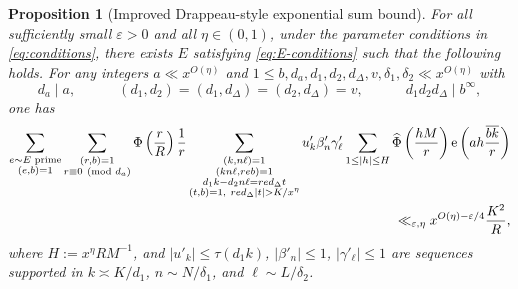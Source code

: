 \documentclass[reqno,11pt]{amsart}
\newtheorem{proposition}[theorem]{Proposition}
\theoremstyle{definition}
\theoremstyle{remark}
\numberwithin{equation}{section}
\newcommand{\e}{\textnormal{e}}
\newcommand{\eps}{\varepsilon}
\renewcommand{\bar}{\overline}
\renewcommand{\hat}{\widehat}
\renewcommand{\pmod}[1]{\ (\textnormal{mod } #1)}
\begin{document}
\begin{proposition}[Improved Drappeau-style exponential sum bound] \label{prop:drappeau-expo}
For all sufficiently small $\eps > 0$ and all $\eta \in (0, 1)$, under the parameter conditions in \cref{eq:conditions}, there exists $E$ satisfying \cref{eq:E-conditions} such that the following holds. For any integers $a \ll x^{O(\eta)}$ and $1 \le b, d_a, d_1, d_2, d_\Delta, v, \delta_1, \delta_2 \ll x^{O(\eta)}$ with
\[
    d_a \mid a, \qquad\quad 
    (d_1, d_2) = (d_1, d_\Delta) = (d_2, d_\Delta) = v, \qquad\quad 
    d_1d_2d_\Delta \mid b^\infty,
\]
one has
\[
\begin{aligned}
    \sum_{\substack{e \sim E \text{ prime} \\ (e, b) = 1}} \sum_{\substack{(r, b) = 1 \\ r \equiv 0 \pmod{d_a}}} \Phi\left(\frac{r}{R}\right) \frac{1}{r} 
    \sum_{\substack{(k, n\ell) = 1 \\ (k n \ell, reb) = 1 \\ d_1k - d_2n \ell = red_\Delta t \\ (t, b) = 1,\  red_\Delta |t| > K/x^\eta}} u'_k \beta'_n \gamma'_\ell
    \sum_{1 \le |h| \le H} \hat{\Phi}\left(\frac{hM}{r}\right) \e\left(a h \frac{\bar{bk}}{r} \right)
    \\
    \ll_{\eps, \eta} x^{O(\eta)-\eps/4} \frac{K^2}{R},
\end{aligned}
\]
where $H := x^\eta R M^{-1}$, and $|u'_k| \le \tau(d_1 k)$, $|\beta'_n| \le 1$, $|\gamma'_\ell| \le 1$ are sequences supported in $k \asymp K/d_1$, $n \sim N/\delta_1$, and $\ell \sim L/\delta_2$.
\end{proposition}
\end{document}
